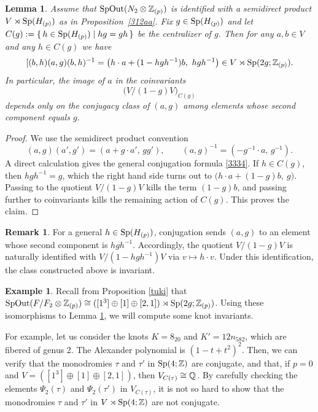 \documentclass{article}
\theoremstyle{plain}
\newtheorem{lem}[thm]{Lemma}
\theoremstyle{definition}
\newtheorem{exa}[thm]{Example}
\newtheorem{rem}[thm]{Remark}
\newcommand{\Q}{{\Bbb Q}}
\newcommand{\Z}{{\Bbb Z}}
\newcommand{\Sp}{{\rm Sp}}
\newcommand{\SpOut}{{\rm SpOut}}
\begin{document}
{\begin{lem}\label{p3k}
Assume that $\SpOut(N_2\otimes \Z_{(p)})$ is identified with a semidirect product
$V\rtimes \Sp(H_{(p)})$ as in Proposition~\ref{312aa}.
Fix $g\in \Sp(H_{(p)})$ and let $
C(g):=\{\,h\in \Sp(H_{(p)})\mid hg=gh\,\}
$ be the centralizer of $g$.
Then for any $a,b\in V$ and any $h\in C(g)$ we have
\begin{equation}\label{3334} [(b,h)(a,g)(b,h)^{-1}=\bigl(h\cdot a+(1-hgh^{-1})b,\ hgh^{-1}\bigr) \in V \rtimes \Sp(2g; \Z_{(p)}).\end{equation} 
In particular, the image of $a$ in the coinvariants
\[
\bigl(V/(1-g)V\bigr)_{C(g)}
\]
depends only on the conjugacy class of $(a,g)$ among elements whose second component equals $g$.
\end{lem}
\begin{proof}We use the semidirect product convention
\[
(a,g)(a',g')=(a+g\cdot a',\, gg') ,\qquad (a,g)^{-1}=(-g^{-1}\cdot a,\, g^{-1}).
\]
A direct calculation gives the general conjugation formula \eqref{3334}. %
If $h\in C(g)$, then $hgh^{-1}=g$, which the right hand side turns out to %
$\bigl(h\cdot a+(1-g)b,\ g\bigr).$
Passing to the quotient $V/(1-g)V$ kills the term $(1-g)b$, and passing further to coinvariants
kills the remaining action of $C(g)$. This proves the claim.
\end{proof}
\begin{rem}
For a general $h\in \Sp(H_{(p)})$, conjugation sends $(a,g)$ to an element whose second component is
$hgh^{-1}$. Accordingly, the quotient $V/(1-g)V$ is naturally identified with $V/(1-hgh^{-1})V$
via $v\mapsto h\cdot v$. Under this identification, the class constructed above is invariant.
\end{rem}
\begin{exa}\label{p3k3}
Recall from Proposition \ref{tuki} that $\SpOut(F/F_2 \otimes \Z_{(p)}) \cong ([1^3] \oplus [1] \oplus [2,1]) \rtimes \Sp(2g; \Z_{(p)}) $. Using these isomorphisms to Lemma \ref{p3k}, we will compute some knot invariants.

For example, let us consider the knots $ K=8_{20}$ and $K'= 12n_{582}$, which are fibered of genus 2. The Alexander polynomial is $(1-t+t^2)^2 $. Then, we can verify that the monodromies $\tau$ and $\tau'$ in $\Sp(4;\Z)$ are conjugate, and that, if $p=0$ and $V= ([1^3] \oplus [1] \oplus [2,1])$, then $ V_{C(\tau)} \cong \Q^{} $. By carefully checking the elements $\Psi_2(\tau)$ and $\Psi_2(\tau' )$ in $V_{C(\tau)} $, it is not so hard to show that the monodromies $\tau$ and $\tau'$ in $V \rtimes \Sp(4;\Z)$ are not conjugate.
\end{exa}

}
\end{document}

